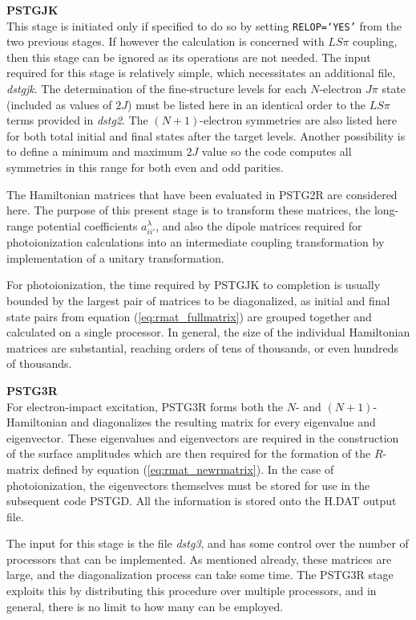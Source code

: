 \protect\textbf{PSTGJK}\\
This stage is initiated only if specified to do so by setting \texttt{RELOP=`YES'} from the two previous stages. If however the calculation is concerned with $LS\pi$ coupling, then this stage can be ignored as its operations are not needed. The input required for this stage is relatively simple, which necessitates an additional file, \textit{dstgjk}. The determination of the fine-structure levels for each $N$-electron $J\pi$ state (included as values of $2J$) must be listed here in an identical order to the $LS\pi$ terms provided in \textit{dstg2}. The $(N+1)$-electron symmetries are also listed here for both total initial and final states after the target levels. Another possibility is to define a minimum and maximum $2J$ value so the code computes all symmetries in this range for both even and odd parities.

The Hamiltonian matrices that have been evaluated in PSTG2R are considered here. The purpose of this present stage is to transform these matrices, the long-range potential coefficients $a_{ii'}^\lambda$, and also the dipole matrices required for photoionization calculations into an intermediate coupling transformation by implementation of a unitary transformation.

For photoionization, the time required by PSTGJK to completion is usually bounded by the largest pair of matrices to be diagonalized, as initial and final state pairs from equation (\ref{eq:rmat_fullmatrix}) are grouped together and calculated on a single processor. In general, the size of the individual Hamiltonian matrices are substantial, reaching orders of tens of thousands, or even hundreds of thousands. 

\protect\textbf{PSTG3R}\\
For electron-impact excitation, PSTG3R forms both the $N$- and $(N+1)$-Hamiltonian and diagonalizes the resulting matrix for every eigenvalue and eigenvector. These eigenvalues and eigenvectors are required in the construction of the surface amplitudes which are then required for the formation of the $R$-matrix defined by equation (\ref{eq:rmat_newrmatrix}). In the case of photoionization, the eigenvectors themselves must be stored for use in the subsequent code PSTGD. All the information is stored onto the H.DAT output file.

The input for this stage is the file \textit{dstg3}, and has some control over the number of processors that can be implemented. As mentioned already, these matrices are large, and the diagonalization process can take some time. The PSTG3R stage exploits this by distributing this procedure over multiple processors, and in general, there is no limit to how many can be employed.

